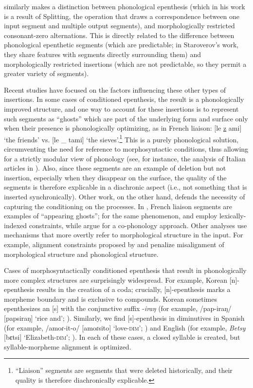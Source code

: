 \documentclass[output=paper,colorlinks,citecolor=brown]{langscibook}
\begin{document}
\citet{Staroverov2014} similarly makes a distinction between phonological epenthesis (which in his work is a result of Splitting, the operation that draws a correspondence between one input segment and multiple output segments), and morphologically restricted consonant-zero alternations. This is directly related to the difference between phonological epenthetic segments (which are predictable; in Staroverov’s work, they share features with segments directly surrounding them) and morphologically restricted insertions (which are not predictable, so they permit a greater variety of segments).

Recent studies have focused on the factors influencing these other types of insertions. In some cases of conditioned epenthesis, the result is a phonologically improved structure, and one way to account for these insertions is to represent such segments as “ghosts” which are part of the underlying form and surface only when their presence is phonologically optimizing, as in French liaison: [le \underline{z} ami] ‘the friends’ vs. [le \_ tami] ‘the sieves’.\footnote{“Liaison” segments are segments that were deleted historically, and their quality is therefore diachronically explicable.} This is a purely phonological solution, circumventing the need for reference to morphosyntactic conditions, thus allowing for a strictly modular view of phonology (see, for instance, the analysis of Italian articles in \citealt{Faustetal2018}). Also, since these segments are an example of deletion but not insertion, especially when they disappear on the surface, the quality of the segments is therefore explicable in a diachronic aspect (i.e., not something that is inserted synchronically). Other work, on the other hand, defends the necessity of capturing the conditioning on the processes. In \citet{Zimmermann2019}, French liaison segments are examples of “appearing ghosts”; for the same phenomenon, \citet{Fukazawa1999} and \citet{Pater2010} employ lexically-indexed constraints, while \citet{InkelasZoll2007} argue for a co-phonology approach. Other analyses use mechanisms that more overtly refer to morphological structure in the input. For example, alignment constraints proposed by \citet{Jun2015} and \citet{Blaylock2017} penalize misalignment of morphological structure and phonological structure.

Cases of morphosyntactically conditioned epenthesis that result in phonologically more complex structures are surprisingly widespread. For example, Korean [n]-epenthesis results in the creation of a coda; crucially, [n]-epenthesis marks a morpheme boundary and is exclusive to compounds. Korean sometimes epenthesizes an [s] with the conjunctive suffix {}-\textit{iraŋ} (for example, /pap-iraŋ/ [papsiraŋ] ‘rice and’; \citealt{Kim2022a}). Similarly, we find [s]-epenthesis in diminutives in Spanish (for example, /amoɾ-it-o/ [amoɾsito] ‘love-\textsc{dim}’; \citealt{Kim2022a}) and English (for example, \textit{Betsy} [bɛtsi] ‘Elizabeth-\textsc{dim}’; \citealt{Kim2022b, Kim2022a}). In each of these cases, a closed syllable is created, but syllable-morpheme alignment is optimized.
\end{document}

